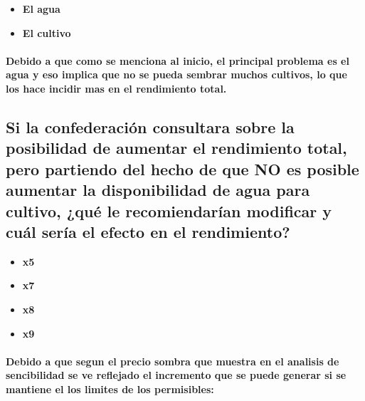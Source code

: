 \documentclass[
]{article}
\providecommand{\tightlist}{%
  \setlength{\itemsep}{0pt}\setlength{\parskip}{0pt}}
\begin{document}
\begin{itemize}
\tightlist
\item
  \textbf{El agua}
\item
  \textbf{El cultivo}
\end{itemize}

\hypertarget{debido-a-que-como-se-menciona-al-inicio-el-principal-problema-es-el-agua-y-eso-implica-que-no-se-pueda-sembrar-muchos-cultivos-lo-que-los-hace-incidir-mas-en-el-rendimiento-total.}{%
\paragraph{Debido a que como se menciona al inicio, el principal
problema es el agua y eso implica que no se pueda sembrar muchos
cultivos, lo que los hace incidir mas en el rendimiento
total.}\label{debido-a-que-como-se-menciona-al-inicio-el-principal-problema-es-el-agua-y-eso-implica-que-no-se-pueda-sembrar-muchos-cultivos-lo-que-los-hace-incidir-mas-en-el-rendimiento-total.}}

\hypertarget{si-la-confederaciuxf3n-consultara-sobre-la-posibilidad-de-aumentar-el-rendimiento-total-pero-partiendo-del-hecho-de-que-no-es-posible-aumentar-la-disponibilidad-de-agua-para-cultivo-quuxe9-le-recomiendaruxedan-modificar-y-cuuxe1l-seruxeda-el-efecto-en-el-rendimiento}{%
\subsection{Si la confederación consultara sobre la posibilidad de
aumentar el rendimiento total, pero partiendo del hecho de que NO es
posible aumentar la disponibilidad de agua para cultivo, ¿qué le
recomiendarían modificar y cuál sería el efecto en el
rendimiento?}\label{si-la-confederaciuxf3n-consultara-sobre-la-posibilidad-de-aumentar-el-rendimiento-total-pero-partiendo-del-hecho-de-que-no-es-posible-aumentar-la-disponibilidad-de-agua-para-cultivo-quuxe9-le-recomiendaruxedan-modificar-y-cuuxe1l-seruxeda-el-efecto-en-el-rendimiento}}

\begin{itemize}
\tightlist
\item
  \textbf{x5}
\item
  \textbf{x7}
\item
  \textbf{x8}
\item
  \textbf{x9}
\end{itemize}

\hypertarget{debido-a-que-segun-el-precio-sombra-que-muestra-en-el-analisis-de-sencibilidad-se-ve-reflejado-el-incremento-que-se-puede-generar-si-se-mantiene-el-los-limites-de-los-permisibles}{%
\paragraph{Debido a que segun el precio sombra que muestra en el
analisis de sencibilidad se ve reflejado el incremento que se puede
generar si se mantiene el los limites de los
permisibles:}\label{debido-a-que-segun-el-precio-sombra-que-muestra-en-el-analisis-de-sencibilidad-se-ve-reflejado-el-incremento-que-se-puede-generar-si-se-mantiene-el-los-limites-de-los-permisibles}}
\end{document}
